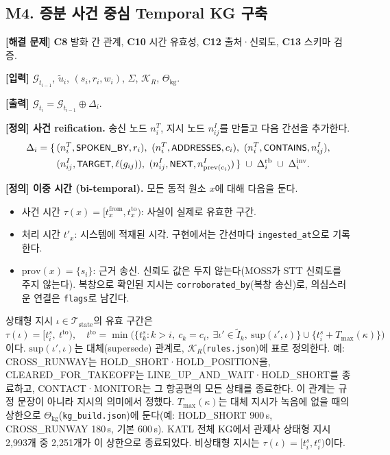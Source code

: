 \documentclass[10pt,a4paper]{article}
\newcommand{\G}{\mathcal{G}}
\newcommand{\Tst}{\mathcal{T}_{\mathrm{state}}}
\newcommand{\KR}{\mathcal{K}_R}
\newcommand{\Cfg}{\Theta_{\mathrm{kg}}}
\newcommand{\cmd}[1]{\textsf{\small #1}}
\newcommand{\ch}[1]{\textbf{\textcolor{red!60!black}{#1}}}
\begin{document}
\subsection{M4. 증분 사건 중심 Temporal KG 구축}
\textbf{[해결 문제]} \ch{C8} 발화 간 관계, \ch{C10} 시간 유효성, \ch{C12} 출처·신뢰도, \ch{C13} 스키마 검증.

\textbf{[입력]} $\G_{t_{i-1}}$, $\tilde u_i$, $(s_i, r_i, w_i)$, $\Sigma$, $\KR$, $\Cfg$.

\textbf{[출력]} $\G_{t_i} = \G_{t_{i-1}} \oplus \Delta_i$.

\textbf{[정의] 사건 reification.} 송신 노드 $n^{T}_i$, 지시 노드 $n^{I}_{ij}$를 만들고 다음 간선을 추가한다.
\begin{align}
\Delta_i = \{\,& (n^{T}_i,\cmd{SPOKEN\_BY},r_i),\ (n^{T}_i,\cmd{ADDRESSES},c_i),\ (n^{T}_i,\cmd{CONTAINS},n^{I}_{ij}),\nonumber\\
& (n^{I}_{ij},\cmd{TARGET},\ell(g_{ij})),\ (n^{I}_{ij},\cmd{NEXT},n^{I}_{\mathrm{prev}(c_i)})\,\} \;\cup\; \Delta^{\mathrm{rb}}_i \;\cup\; \Delta^{\mathrm{inv}}_i .
\end{align}

\textbf{[정의] 이중 시간 (bi-temporal).} 모든 동적 원소 $x$에 대해 다음을 둔다.
\begin{itemize}
\item 사건 시간 $\tau(x) = [t^{\mathrm{from}}_x, t^{\mathrm{to}}_x)$: 사실이 실제로 유효한 구간.
\item 처리 시간 $t'_x$: 시스템에 적재된 시각. 구현에서는 간선마다 \texttt{ingested\_at}으로 기록한다.
\item $\mathrm{prov}(x)=\{s_i\}$: 근거 송신. 신뢰도 값은 두지 않는다(MOSS가 STT 신뢰도를 주지 않는다). 복창으로 확인된 지시는 \texttt{corroborated\_by}(복창 송신)로, 의심스러운 연결은 \texttt{flags}로 남긴다.
\end{itemize}
상태형 지시 $\iota\in\Tst$의 유효 구간은
\begin{equation}
\tau(\iota) = \big[t^s_i,\ t^{\mathrm{to}}\big),\quad
t^{\mathrm{to}} = \min\Big(\{t^s_k : k>i,\ c_k=c_i,\ \exists\iota'\in \tilde I_k,\ \mathrm{sup}(\iota',\iota)\} \cup \{t^s_i + T_{\max}(\kappa)\}\Big)
\end{equation}
이다. $\mathrm{sup}(\iota',\iota)$는 대체(supersede) 관계로, $\KR$(\texttt{rules.json})에 표로 정의한다. 예: \cmd{CROSS\_RUNWAY}는 \cmd{HOLD\_SHORT}·\cmd{HOLD\_POSITION}을, \cmd{CLEARED\_FOR\_TAKEOFF}는 \cmd{LINE\_UP\_AND\_WAIT}·\cmd{HOLD\_SHORT}를 종료하고, \cmd{CONTACT}·\cmd{MONITOR}는 그 항공편의 모든 상태를 종료한다. 이 관계는 규정 문장이 아니라 지시의 의미에서 정했다. $T_{\max}(\kappa)$는 대체 지시가 녹음에 없을 때의 상한으로 $\Cfg$(\texttt{kg\_build.json})에 둔다(예: \cmd{HOLD\_SHORT} 900\,s, \cmd{CROSS\_RUNWAY} 180\,s, 기본 600\,s). KATL 전체 KG에서 관제사 상태형 지시 2{,}993개 중 2{,}251개가 이 상한으로 종료되었다. 비상태형 지시는 $\tau(\iota)=[t^s_i,t^e_i)$이다.
\end{document}
